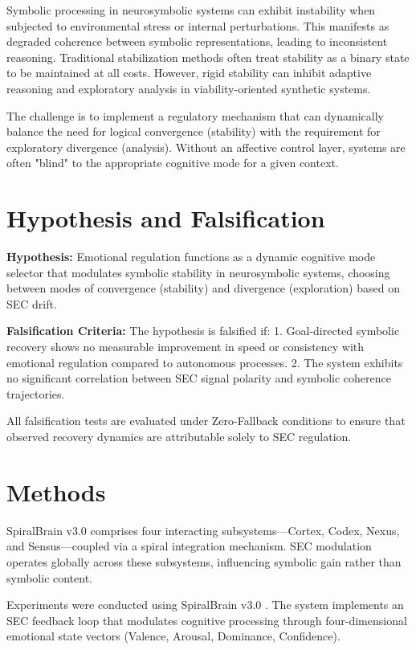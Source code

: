 \documentclass[11pt]{article}
\begin{document}
Symbolic processing in neurosymbolic systems can exhibit instability when subjected to environmental stress or internal perturbations. This manifests as degraded coherence between symbolic representations, leading to inconsistent reasoning. Traditional stabilization methods often treat stability as a binary state to be maintained at all costs. However, rigid stability can inhibit adaptive reasoning and exploratory analysis in viability-oriented synthetic systems.

The challenge is to implement a regulatory mechanism that can dynamically balance the need for logical convergence (stability) with the requirement for exploratory divergence (analysis). Without an affective control layer, systems are often "blind" to the appropriate cognitive mode for a given context.

\section{Hypothesis and Falsification}

\textbf{Hypothesis:} Emotional regulation functions as a dynamic cognitive mode selector that modulates symbolic stability in neurosymbolic systems, choosing between modes of convergence (stability) and divergence (exploration) based on SEC drift.

\textbf{Falsification Criteria:}
The hypothesis is falsified if:
1. Goal-directed symbolic recovery shows no measurable improvement in speed or consistency with emotional regulation compared to autonomous processes.
2. The system exhibits no significant correlation between SEC signal polarity and symbolic coherence trajectories.

All falsification tests are evaluated under Zero-Fallback conditions to ensure that observed recovery dynamics are attributable solely to SEC regulation.

\section{Methods}

SpiralBrain v3.0 comprises four interacting subsystems—Cortex, Codex, Nexus, and Sensus—coupled via a spiral integration mechanism. SEC modulation operates globally across these subsystems, influencing symbolic gain rather than symbolic content.

Experiments were conducted using SpiralBrain v3.0 \cite{SpiralBrainV3}. The system implements an SEC feedback loop that modulates cognitive processing through four-dimensional emotional state vectors (Valence, Arousal, Dominance, Confidence).
\end{document}
